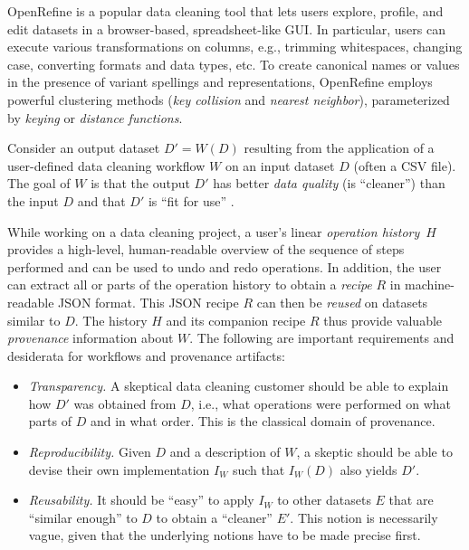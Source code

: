\documentclass[runningheads]{llncs}
\begin{document}
OpenRefine \cite{OpenRefine} is a popular data cleaning tool that lets users explore, profile, and
edit datasets in a browser-based, spreadsheet-like GUI. In particular, users can execute various
transformations on columns, e.g., trimming whitespaces, changing case, converting formats and data
types, etc. To create canonical names or values in the presence of variant spellings and
representations, OpenRefine employs powerful clustering methods (\emph{key collision} and
\emph{nearest neighbor}), parameterized by \emph{keying} or \emph{distance functions}. 

Consider an output dataset $D' = W(D)$ resulting from the application of a user-defined data
cleaning workflow $W$ on an input dataset $D$ (often a CSV file). The goal of $W$ is that the output
$D'$ has better \emph{data quality} (is ``cleaner'') than the input $D$ and that $D'$ is ``fit for
use'' \cite{defeo2017juran,wang1996accuracy,sadiq2013handbook}.

While working on a data cleaning project, a user's linear \emph{operation history}~$H$ provides a
high-level, human-readable overview of the sequence of steps performed and can be used to undo and
redo operations. In addition, the user can extract all or parts of the operation history to obtain a
\emph{recipe} $R$ in machine-readable JSON format. This JSON recipe $R$ can then be \emph{reused} on
datasets similar to $D$. The history $H$ and its companion recipe $R$ thus provide valuable
\emph{provenance} information about $W$. The following are important requirements and desiderata for
workflows and provenance artifacts:

\begin{itemize}
\item  \emph{Transparency.} A skeptical data cleaning customer should be able to explain how $D'$ was obtained from $D$, i.e., what operations were performed on what parts of $D$ and in what order. This is the classical domain of provenance.
\item \emph{Reproducibility.} Given $D$ and a description of $W$,  a skeptic should be able to devise their own implementation $I_W$ such that $I_W(D)$ also yields $D'$.
\item 
\emph{Reusability.} It should be ``easy'' to apply $I_W$ to other datasets $E$ that are ``similar
enough'' to $D$ to obtain a ``cleaner'' $E'$. This notion is necessarily vague, given that
the underlying notions have to be made precise first. 
\end{itemize}
\end{document}
